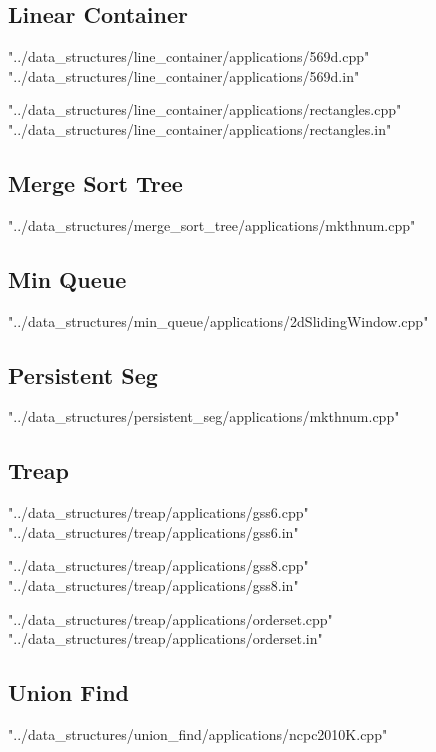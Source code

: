 \documentclass [12pt,onecolumn,oneside]{article}
\begin{document}
\subsection{ Linear Container}
 {"../data_structures/line_container/applications/569d.cpp"}
 {"../data_structures/line_container/applications/569d.in"}
\newpage

 {"../data_structures/line_container/applications/rectangles.cpp"}
 {"../data_structures/line_container/applications/rectangles.in"}
\newpage

\subsection{ Merge Sort Tree}
 {"../data_structures/merge_sort_tree/applications/mkthnum.cpp"}
\newpage

\subsection{ Min Queue}
 {"../data_structures/min_queue/applications/2dSlidingWindow.cpp"}
\newpage

\subsection{ Persistent Seg}
 {"../data_structures/persistent_seg/applications/mkthnum.cpp"}
\newpage

\subsection{ Treap}
 {"../data_structures/treap/applications/gss6.cpp"}
 {"../data_structures/treap/applications/gss6.in"}
\newpage

 {"../data_structures/treap/applications/gss8.cpp"}
 {"../data_structures/treap/applications/gss8.in"}
\newpage

 {"../data_structures/treap/applications/orderset.cpp"}
 {"../data_structures/treap/applications/orderset.in"}
\newpage

\subsection{ Union Find}
 {"../data_structures/union_find/applications/ncpc2010K.cpp"}
\newpage
\end{document}

